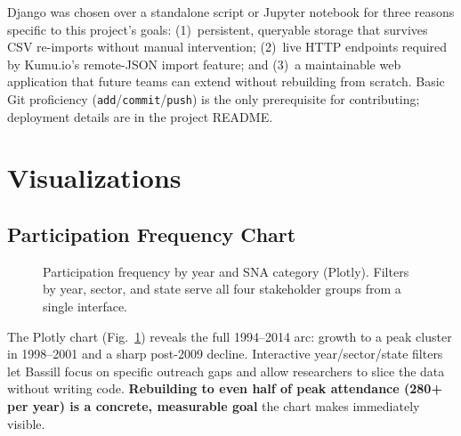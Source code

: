 \documentclass[10pt,twocolumn,letterpaper]{article}
\begin{document}
Django was chosen over a standalone script or Jupyter notebook for
three reasons specific to this project's goals: (1)~persistent,
queryable storage that survives CSV re-imports without manual
intervention; (2)~live HTTP endpoints required by Kumu.io's
remote-JSON import feature; and (3)~a maintainable web application
that future teams can extend without rebuilding from scratch. Basic
Git proficiency (\texttt{add}/\texttt{commit}/\texttt{push}) is the
only prerequisite for contributing; deployment details are in the
project README.

\section{Visualizations}

\subsection{Participation Frequency Chart}

\begin{figure}[t]
  \centering
  \caption{Participation frequency by year and SNA category (Plotly).
    Filters by year, sector, and state serve all four stakeholder groups
    from a single interface.}
  \label{fig:chart}
\end{figure}

The Plotly chart (Fig.~\ref{fig:chart}) reveals the full 1994--2014
arc: growth to a peak cluster in 1998--2001 and a sharp post-2009
decline. Interactive year/sector/state filters let Bassill focus on
specific outreach gaps and allow researchers to slice the data without
writing code. \textbf{Rebuilding to even half of peak attendance
(280+ per year) is a concrete, measurable goal} the chart makes
immediately visible.
\end{document}
